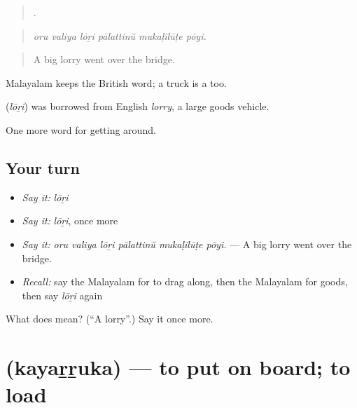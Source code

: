 \begin{quote}
     .
\end{quote}

\begin{quote}
\emph{oru valiya lōṟi pālattinŭ mukaḷilūṭe pōyi.}
\end{quote}

\begin{quote}
A big lorry went over the bridge.
\end{quote}

Malayalam keeps the British word; a truck is a  too.

\begin{cousinweb}
\textbf{} (\emph{lōṟi}) was borrowed from English \emph{lorry}, a large goods vehicle.
\end{cousinweb}

\begin{grammarlens}[title={What you've built}]
One more word for getting around.
\end{grammarlens}

\subsection*{Your turn}
\begin{itemize}
\raggedright
  \item \emph{Say it:} \emph{lōṟi}
  \item \emph{Say it:} \emph{lōṟi}, once more
  \item \emph{Say it:} \emph{oru valiya lōṟi pālattinŭ mukaḷilūṭe pōyi.} — A big lorry went over the bridge.
  \item \emph{Recall:} say the Malayalam for to drag along, then the Malayalam for goods, then say \emph{lōṟi} again
\end{itemize}

\begin{tcolorbox}[breakable,colback=teal!4,colframe=teal!35!black,title={Before you move on}]
What does  mean? (\textquotedblleft{}A lorry\textquotedblright{}.) Say it once more.
\end{tcolorbox}
\section[\texorpdfstring{\ml{കയറ്റുക} (kayaṟṟuka)}{കയറ്റുക (kayaṟṟuka)}]{ (kayaṟṟuka) — to put on board; to load}

\label{lesson:ML-C467-kayarruka}



